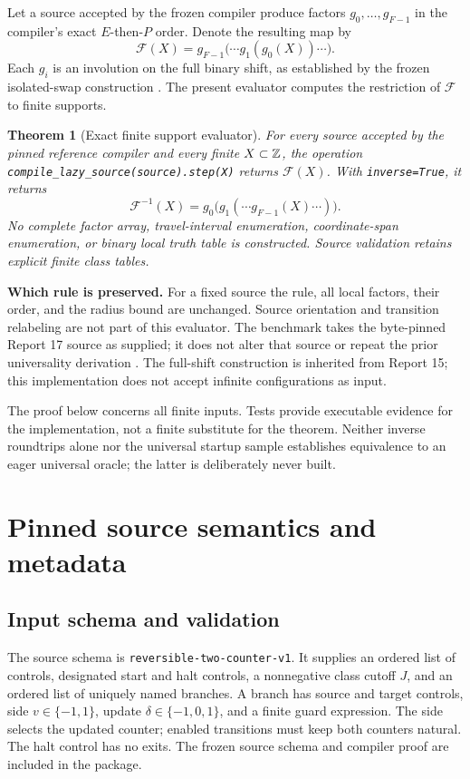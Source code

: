 \documentclass[11pt,a4paper]{article}
\numberwithin{equation}{section}
\newtheorem{theorem}{Theorem}[section]
\begin{document}
Let a source accepted by the frozen compiler produce factors $g_0,\ldots,g_{F-1}$ in the compiler's exact $E$-then-$P$ order. Denote the resulting map by
\[
\mathcal F(X)=g_{F-1}\bigl(\cdots g_1(g_0(X))\cdots\bigr).
\]
Each $g_i$ is an involution on the full binary shift, as established by the frozen isolated-swap construction \cite{fpa:r15}. The present evaluator computes the restriction of $\mathcal F$ to finite supports.

\begin{theorem}[Exact finite support evaluator]\label{fpa:lz:thm:main}
For every source accepted by the pinned reference compiler and every finite $X\subset\mathbb Z$, the operation \texttt{compile\_lazy\_source(source).step(X)} returns $\mathcal F(X)$. With \texttt{inverse=True}, it returns
\[
\mathcal F^{-1}(X)=g_0\bigl(g_1(\cdots g_{F-1}(X)\cdots)\bigr).
\]
No complete factor array, travel-interval enumeration, coordinate-span enumeration, or binary local truth table is constructed. Source validation retains explicit finite class tables.
\end{theorem}

\textbf{Which rule is preserved.} For a fixed source the rule, all local factors, their order, and the radius bound are unchanged. Source orientation and transition relabeling are not part of this evaluator. The benchmark takes the byte-pinned Report 17 source as supplied; it does not alter that source or repeat the prior universality derivation \cite{fpa:r17}. The full-shift construction is inherited from Report 15; this implementation does not accept infinite configurations as input.

The proof below concerns all finite inputs. Tests provide executable evidence for the implementation, not a finite substitute for the theorem. Neither inverse roundtrips alone nor the universal startup sample establishes equivalence to an eager universal oracle; the latter is deliberately never built.

\section{Pinned source semantics and metadata}\label{fpa:lz:sec:pinned}
\subsection{Input schema and validation}
The source schema is \texttt{reversible-two-counter-v1}. It supplies an ordered list of controls, designated start and halt controls, a nonnegative class cutoff $J$, and an ordered list of uniquely named branches. A branch has source and target controls, side $v\in\{-1,1\}$, update $\delta\in\{-1,0,1\}$, and a finite guard expression. The side selects the updated counter; enabled transitions must keep both counters natural. The halt control has no exits. The frozen source schema and compiler proof are included in the package.
\end{document}
